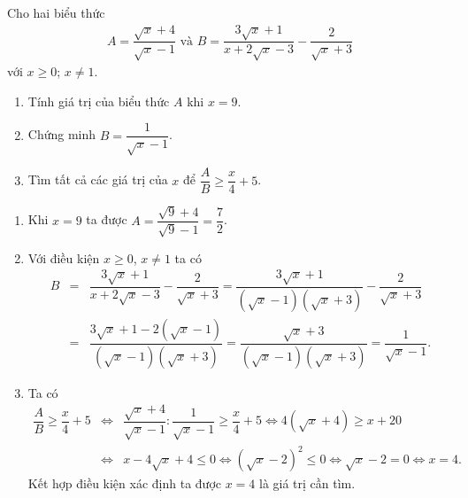 \begin{bt}%
	Cho hai biểu thức
	\begin{eqnarray*}
		A=\dfrac{\sqrt{x}+4}{\sqrt{x}-1} \text{ và } B=\dfrac{3\sqrt{x}+1}{x+2\sqrt{x}-3} - \dfrac{2}{\sqrt{x}+3}
	\end{eqnarray*}
	với $x \geq 0$; $x \neq 1$.
	\begin{enumerate}
		\item Tính giá trị của biểu thức $A$ khi $x=9$.
		\item Chứng minh $B=\dfrac{1}{\sqrt{x}-1}$.
		\item Tìm tất cả các giá trị của $x$ để $\dfrac{A}{B} \geq \dfrac{x}{4}+5$.
	\end{enumerate}
	\loigiai
	{
		\begin{enumerate}
			\item Khi $x=9$ ta được $A=\dfrac{\sqrt{9}+4}{\sqrt{9}-1} = \dfrac{7}{2}$.
			\item Với điều kiện $x \geq 0$, $x\neq 1$ ta có
			\allowdisplaybreaks
			\begin{eqnarray*}
				B &=& \dfrac{3\sqrt{x}+1}{x+2\sqrt{x}-3} - \dfrac{2}{\sqrt{x}+3} = \dfrac{3\sqrt{x}+1}{\left(\sqrt{x}-1\right)\left(\sqrt{x}+3\right)} - \dfrac{2}{\sqrt{x}+3}\\
				&=& \dfrac{3\sqrt{x}+1-2\left(\sqrt{x}-1\right)}{\left(\sqrt{x}-1\right)\left(\sqrt{x}+3\right)} = \dfrac{\sqrt{x}+3}{\left(\sqrt{x}-1\right)\left(\sqrt{x}+3\right)} = \dfrac{1}{\sqrt{x}-1}.
			\end{eqnarray*}
			\item Ta có
			\allowdisplaybreaks
			\begin{eqnarray*}
				\dfrac{A}{B} \geq \dfrac{x}{4}+5 &\Leftrightarrow & \dfrac{\sqrt{x}+4}{\sqrt{x}-1} : \dfrac{1}{\sqrt{x}-1} \geq \dfrac{x}{4} + 5 \Leftrightarrow 4\left(\sqrt{x}+4\right) \geq x + 20\\
				&\Leftrightarrow & x-4\sqrt{x}+4 \leq 0 \Leftrightarrow \left(\sqrt{x}-2\right)^2 \leq 0 \Leftrightarrow \sqrt{x}-2=0 \Leftrightarrow x=4.
			\end{eqnarray*}
			Kết hợp điều kiện xác định ta được $x=4$ là giá trị cần tìm.
		\end{enumerate}
	}
\end{bt}

